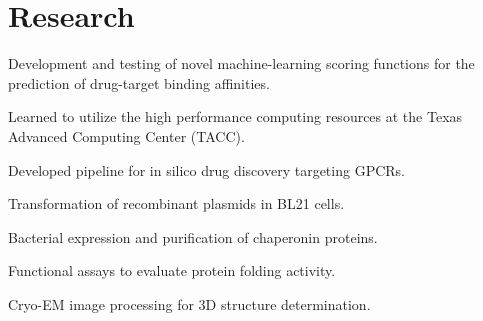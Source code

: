\documentclass[]{deedy-resume-openfont}
\begin{document}
\begin{minipage}[t]{0.66\textwidth}
\section{Research}
\begin{tightemize}
\item Development and testing of novel machine-learning scoring functions for the prediction of drug-target binding affinities. \item Learned to utilize the high performance computing resources at the Texas Advanced Computing Center (TACC). \item Developed pipeline for in silico drug discovery targeting GPCRs.%
\end{tightemize}
\sectionsep


\begin{tightemize}
\item Transformation of recombinant plasmids in BL21 cells. \item Bacterial expression and purification of chaperonin proteins.\item Functional assays to evaluate protein folding activity. \item Cryo-EM image processing for 3D structure determination.\end{tightemize}
\sectionsep



\end{minipage}
\end{document}
